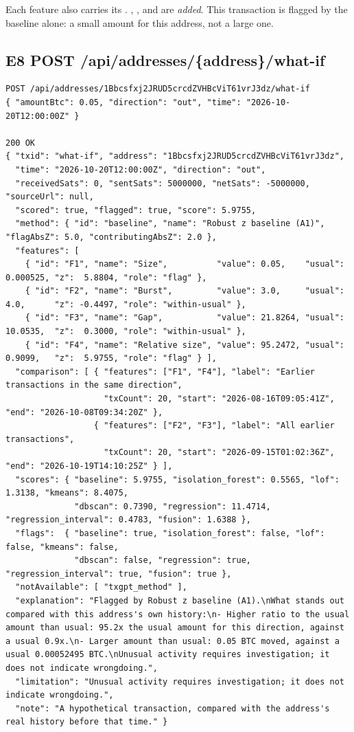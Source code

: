 Each feature also carries its . , , 
and  are \emph{added}. This transaction is flagged by the baseline alone: a small
amount for this address, not a large one.

\subsection{E8 \quad POST /api/addresses/\{address\}/what-if}

\begin{lstlisting}[style=json]
POST /api/addresses/1Bbcsfxj2JRUD5crcdZVHBcViT61vrJ3dz/what-if
{ "amountBtc": 0.05, "direction": "out", "time": "2026-10-20T12:00:00Z" }

200 OK
{ "txid": "what-if", "address": "1Bbcsfxj2JRUD5crcdZVHBcViT61vrJ3dz",
  "time": "2026-10-20T12:00:00Z", "direction": "out",
  "receivedSats": 0, "sentSats": 5000000, "netSats": -5000000, "sourceUrl": null,
  "scored": true, "flagged": true, "score": 5.9755,
  "method": { "id": "baseline", "name": "Robust z baseline (A1)", "flagAbsZ": 5.0, "contributingAbsZ": 2.0 },
  "features": [
    { "id": "F1", "name": "Size",          "value": 0.05,    "usual": 0.000525, "z":  5.8804, "role": "flag" },
    { "id": "F2", "name": "Burst",         "value": 3.0,     "usual": 4.0,      "z": -0.4497, "role": "within-usual" },
    { "id": "F3", "name": "Gap",           "value": 21.8264, "usual": 10.0535,  "z":  0.3000, "role": "within-usual" },
    { "id": "F4", "name": "Relative size", "value": 95.2472, "usual": 0.9099,   "z":  5.9755, "role": "flag" } ],
  "comparison": [ { "features": ["F1", "F4"], "label": "Earlier transactions in the same direction",
                    "txCount": 20, "start": "2026-08-16T09:05:41Z", "end": "2026-10-08T09:34:20Z" },
                  { "features": ["F2", "F3"], "label": "All earlier transactions",
                    "txCount": 20, "start": "2026-09-15T01:02:36Z", "end": "2026-10-19T14:10:25Z" } ],
  "scores": { "baseline": 5.9755, "isolation_forest": 0.5565, "lof": 1.3138, "kmeans": 8.4075,
              "dbscan": 0.7390, "regression": 11.4714, "regression_interval": 0.4783, "fusion": 1.6388 },
  "flags":  { "baseline": true, "isolation_forest": false, "lof": false, "kmeans": false,
              "dbscan": false, "regression": true, "regression_interval": true, "fusion": true },
  "notAvailable": [ "txgpt_method" ],
  "explanation": "Flagged by Robust z baseline (A1).\nWhat stands out compared with this address's own history:\n- Higher ratio to the usual amount than usual: 95.2x the usual amount for this direction, against a usual 0.9x.\n- Larger amount than usual: 0.05 BTC moved, against a usual 0.00052495 BTC.\nUnusual activity requires investigation; it does not indicate wrongdoing.",
  "limitation": "Unusual activity requires investigation; it does not indicate wrongdoing.",
  "note": "A hypothetical transaction, compared with the address's real history before that time." }


\end{lstlisting}

